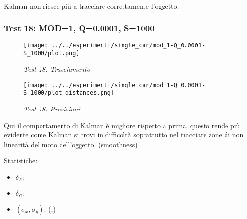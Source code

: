 Kalman non riesce più a tracciare correttamente l'oggetto.

\newpage
\subsubsection{Test 18: MOD=1, Q=0.0001, S=1000}

\begin{figure}[hb]
\centering
\texttt{[image: ../../esperimenti/single\_car/mod\_1-Q\_0.0001-S\_1000/plot.png]}
\caption{\textit{Test 18: Tracciamento}}
\end{figure}

\begin{figure}[hb]
\centering
\texttt{[image: ../../esperimenti/single\_car/mod\_1-Q\_0.0001-S\_1000/plot-distances.png]}
\caption{\textit{Test 18: Previsioni}}
\end{figure}

Qui il comportamento di Kalman è migliore rispetto a prima, questo rende più evidente come Kalman si trovi in difficoltà soprattutto nel tracciare zone di non linearità del moto dell'oggetto. (smoothness)

Statistiche:
\begin{itemize}
\item \begin{math} \bar \delta_K:  \end{math}
\item \begin{math} \bar \delta_C:  \end{math}
\item \begin{math}(\sigma_x,\sigma_y)\end{math}: (,)
\end{itemize}

